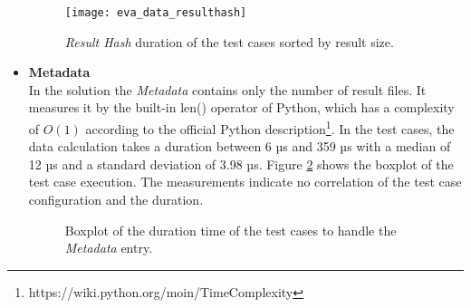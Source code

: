 \documentclass[draft,final]{vutinfth} %
\begin{document}
\begin{itemize}
	\begin{figure}[h]
		\centering
		\texttt{[image: eva\_data\_resulthash]}
		\caption{\textit{Result Hash} duration of the test cases sorted by result size.}
		\label{fig:evaluation_data_resulthash} %
	\end{figure}
	

	\item \textbf{Metadata} \\
	In the solution the \textit{Metadata} contains only the number of result files. It measures it by the built-in len() operator of Python, which has a complexity of $O(1)$ according to the official Python description\footnote{https://wiki.python.org/moin/TimeComplexity}. In the test cases, the data calculation takes a duration between 6 µs and 359 µs with a median of 12 µs and a standard deviation of 3.98 µs. Figure \ref{fig:evaluation_perf_meta_data} shows the boxplot of the test case execution. The measurements indicate no correlation of the test case configuration and the duration.
	\begin{figure}[!h]
		\centering
		\caption{Boxplot of the duration time of the test cases to handle the \textit{Metadata} entry.}
		\label{fig:evaluation_perf_meta_data}	
	\end{figure}
	

\end{itemize}
\end{document}
